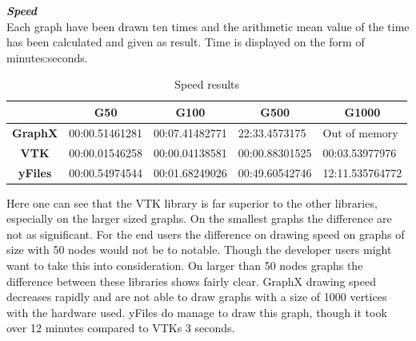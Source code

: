 \documentclass[a4paper,11pt]{kth-mag}
\begin{document}
\begin{appendices}
\label{sec:library:results}
\textbf{\textit{Speed}}\\
\newline
Each graph have been drawn ten times and the arithmetic mean value of the time has been calculated and given as result. Time is displayed on the form of minutes:seconds.\
\newline
\begin{table}[h]
\centering
\caption{Speed results}
\begin{tabular}{|c|l|l|l|l|}
\hline
\multicolumn{1}{|l|}{} & \multicolumn{1}{c|}{\textbf{G50}} & \multicolumn{1}{c|}{\textbf{G100}} & \multicolumn{1}{c|}{\textbf{G500}} & \multicolumn{1}{c|}{\textbf{G1000}} \\ \hline
\textbf{GraphX}        & 00:00.51461281                    & 00:07.41482771                     & 22:33.4573175                      & Out of memory                       \\ \hline
\textbf{VTK}           & 00:00.01546258                    & 00:00.04138581                     & 00:00.88301525                     & 00:03.53977976                      \\ \hline
\textbf{yFiles}        & 00:00.54974544                    & 00:01.68249026                     & 00:49.60542746                     & 12:11.535764772                     \\ \hline
\end{tabular}
\label{table:librarie-speed:appendix}
\end{table}
\newline
Here one can see that the VTK library is far superior to the other libraries, especially on the larger sized graphs. 
On the smallest graphs the difference are not as significant. For the end users the difference on drawing speed on graphs of size with 50 nodes would not be to notable.
Though the developer users might want to take this into consideration. 
On larger than 50 nodes graphs the difference between these libraries shows fairly clear. GraphX drawing speed decreases rapidly and are not able to draw graphs with a size of 1000 vertices with the hardware used.
yFiles do manage to draw this graph, though it took over 12 minutes compared to VTKs 3 seconds.\\


\end{appendices}
\end{document}
